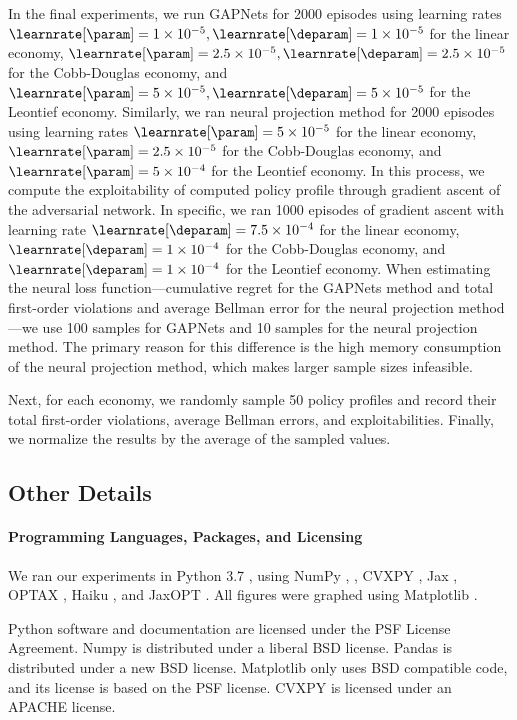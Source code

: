 In the final experiments, we run GAPNets for 2000 episodes using learning rates $\learnrate[\param]=1\times 10^{-5}, \learnrate[\deparam]=1\times 10^{-5}$ for the linear economy, 
$\learnrate[\param]=2.5\times 10^{-5}, \learnrate[\deparam]=2.5\times 10^{-5}$ for the Cobb-Douglas economy, 
and $\learnrate[\param]=5\times 10^{-5}, \learnrate[\deparam]=5\times 10^{-5}$ for the Leontief economy. 
Similarly, we ran neural projection method for 2000 episodes using learning rates
$\learnrate[\param]=5\times 10^{-5}$ for the linear economy,
$\learnrate[\param]=2.5\times 10^{-5}$ for the Cobb-Douglas economy,
and $\learnrate[\param]=5\times 10^{-4}$ for the Leontief economy.
In this process, we compute the exploitability of computed policy profile through gradient ascent of the adversarial network. In specific, we ran 1000 episodes of gradient ascent with learning rate $\learnrate[\deparam]=7.5\times 10^{-4}$ for the linear economy, 
$\learnrate[\deparam]=1\times 10^{-4}$ for the Cobb-Douglas economy, 
and $\learnrate[\deparam]=1\times 10^{-4}$ for the Leontief economy. When estimating the neural loss function—cumulative regret for the GAPNets method and total first-order violations and average Bellman error for the neural projection method—we use 100 samples for GAPNets and 10 samples for the neural projection method. The primary reason for this difference is the high memory consumption of the neural projection method, which makes larger sample sizes infeasible. 


Next, for each economy, we randomly sample 50 policy profiles and record their total first-order violations, average Bellman errors, and exploitabilities. Finally, we normalize the results by the average of the sampled values.

\subsection{Other Details}

\paragraph{Programming Languages, Packages, and Licensing}
We ran our experiments in Python 3.7 \cite{van1995python}, using NumPy \cite{numpy},  , CVXPY \cite{diamond2016cvxpy}, Jax \cite{jax2018github}, OPTAX \cite{jax2018github}, Haiku \cite{haiku2020github}, and  JaxOPT \cite{jaxopt_implicit_diff}.
All figures were graphed using Matplotlib \cite{matplotlib}. 

Python software and documentation are licensed under the PSF License Agreement. Numpy is distributed under a liberal BSD license. Pandas is distributed under a new BSD license. Matplotlib only uses BSD compatible code, and its license is based on the PSF license. CVXPY is licensed under an APACHE license. 

